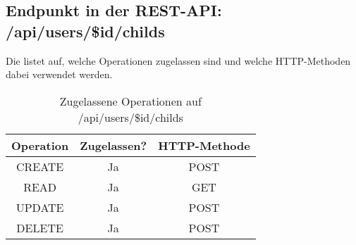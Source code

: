\subsection{Endpunkt in der REST-API: /api/users/\$id/childs}
Die  listet auf, welche Operationen zugelassen sind und welche HTTP-Methoden dabei verwendet werden. 

\begin{table}[!htbp]
	\begin{tabular}{|c|c|c|}
		\hline
			\textbf{Operation} & \textbf{Zugelassen?} & \textbf{HTTP-Methode} \\ \hline
			CREATE & Ja & POST \\ \hline 
			READ & Ja & GET \\ \hline
			UPDATE & Ja & POST \\ \hline 
			DELETE & Ja & POST \\ \hline
	\end{tabular}

		\caption{Zugelassene Operationen auf /api/users/\$id/childs}
		\label{tab:rest:api:users:id:childs:meth}
\end{table}

